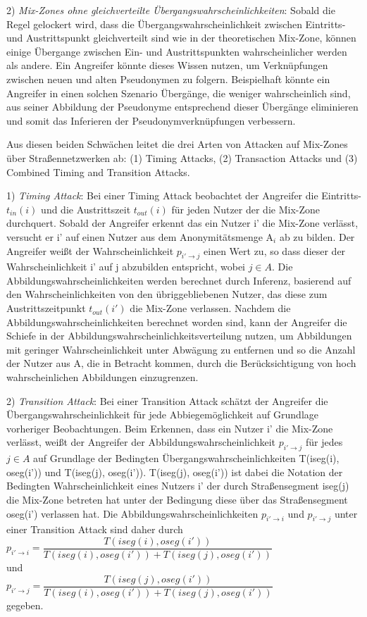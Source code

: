 2)	\textit{Mix-Zones ohne gleichverteilte Übergangswahrscheinlichkeiten}: Sobald die Regel gelockert wird, dass die Übergangswahrscheinlichkeit zwischen Eintritts- und Austrittspunkt gleichverteilt sind wie in der theoretischen Mix-Zone, können einige Übergange zwischen Ein- und Austrittspunkten wahrscheinlicher werden als andere. Ein Angreifer könnte dieses Wissen nutzen, um  Verknüpfungen zwischen neuen und alten Pseudonymen zu folgern. Beispielhaft könnte ein Angreifer in einen solchen Szenario Übergänge, die weniger wahrscheinlich sind, aus seiner Abbildung der Pseudonyme entsprechend dieser Übergänge eliminieren und somit das Inferieren der Pseudonymverknüpfungen verbessern.

Aus diesen beiden Schwächen leitet \cite{Palanisamy2015} die drei Arten von Attacken auf Mix-Zones über Straßennetzwerken ab: (1) Timing Attacks, (2) Transaction Attacks und (3) Combined Timing and Transition Attacks.

1)	\textit{Timing Attack}: Bei einer Timing Attack beobachtet der Angreifer die Eintritts- $t_{in}(i)$ und die Austrittszeit $t_{out}(i)$ für jeden Nutzer der die Mix-Zone durchquert. Sobald der Angreifer erkennt das ein Nutzer i' die Mix-Zone verlässt, versucht er i' auf einen Nutzer aus dem Anonymitätsmenge A$_{i}$ ab zu bilden. Der Angreifer weißt der Wahrscheinlichkeit $p_{i'\rightarrow j}$ einen Wert zu, so dass dieser der Wahrscheinlichkeit i' auf j abzubilden entspricht, wobei $j \in A$. Die Abbildungswahrscheinlichkeiten werden berechnet durch Inferenz, basierend auf den Wahrscheinlichkeiten von den übriggebliebenen Nutzer, das diese zum Austrittszeitpunkt $t_{out}(i')$ die Mix-Zone verlassen. Nachdem die Abbildungswahrscheinlichkeiten berechnet worden sind, kann der Angreifer die Schiefe in der Abbildungswahrscheinlichkeitsverteilung nutzen, um Abbildungen mit geringer Wahrscheinlichkeit  unter Abwägung zu entfernen und so die Anzahl der Nutzer aus A, die in Betracht kommen, durch die Berücksichtigung von hoch wahrscheinlichen Abbildungen einzugrenzen.

2)	\textit{Transition Attack}: Bei einer Transition Attack schätzt der Angreifer die Übergangswahrscheinlichkeit für jede Abbiegemöglichkeit auf Grundlage vorheriger Beobachtungen. Beim Erkennen, dass ein Nutzer i' die Mix-Zone verlässt, weißt der Angreifer der Abbildungswahrscheinlichkeit $p_{i'\rightarrow j}$  für jedes $j \in A$ auf Grundlage der Bedingten Übergangswahrscheinlichkeiten T(iseg(i), oseg(i')) und T(iseg(j), oseg(i')).  T(iseg(j), oseg(i')) ist dabei die Notation der Bedingten Wahrscheinlichkeit eines Nutzers i' der durch Straßensegment iseg(j) die Mix-Zone betreten hat unter der Bedingung diese über das Straßensegment oseg(i') verlassen hat. Die Abbildungswahrscheinlichkeiten  $p_{i'\rightarrow i}$ und $p_{i'\rightarrow j}$ unter einer Transition Attack sind daher durch \\
$p_{i'\rightarrow i} = \dfrac{T(iseg(i), oseg(i'))}{T(iseg(i), oseg(i')) + T(iseg(j), oseg(i'))} $\\
und \\
$p_{i'\rightarrow j} = \dfrac{T(iseg(j), oseg(i'))}{T(iseg(i), oseg(i')) + T(iseg(j), oseg(i'))} $ \\ gegeben.

